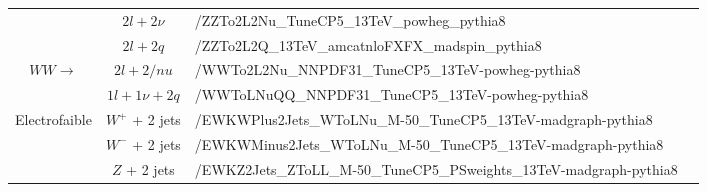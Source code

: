 \begin{table}[]
{{\begin{tabular}{|cclc|}
\multicolumn{1}{|c|}{}                                            & \multicolumn{1}{c|}{$2l+2\nu$}              & \multicolumn{1}{l|}{/ZZTo2L2Nu\_TuneCP5\_13TeV\_powheg\_pythia8}                                         &                       \\ \cline{2-4} 
\multicolumn{1}{|c|}{}                                            & \multicolumn{1}{c|}{$2l+2q$}                & \multicolumn{1}{l|}{/ZZTo2L2Q\_13TeV\_amcatnloFXFX\_madspin\_pythia8}                                    &                       \\ \hline
\multicolumn{1}{|c|}{\multirow{2}{*}{$WW\rightarrow$}}            & \multicolumn{1}{c|}{$2l+2/nu$}              & \multicolumn{1}{l|}{/WWTo2L2Nu\_NNPDF31\_TuneCP5\_13TeV-powheg-pythia8}                                  &                       \\ \cline{2-4} 
\multicolumn{1}{|c|}{}                                            & \multicolumn{1}{c|}{$1l+1\nu+2q$}           & \multicolumn{1}{l|}{/WWToLNuQQ\_NNPDF31\_TuneCP5\_13TeV-powheg-pythia8}                                  &                       \\ \hline
\multicolumn{1}{|c|}{\multirow{3}{*}{Electrofaible}}              & \multicolumn{1}{c|}{$W^+$ + 2 jets}         & \multicolumn{1}{l|}{/EWKWPlus2Jets\_WToLNu\_M-50\_TuneCP5\_13TeV-madgraph-pythia8}                       &                       \\ \cline{2-4} 
\multicolumn{1}{|c|}{}                                            & \multicolumn{1}{c|}{$W^-$ + 2 jets}         & \multicolumn{1}{l|}{/EWKWMinus2Jets\_WToLNu\_M-50\_TuneCP5\_13TeV-madgraph-pythia8}                      &                       \\ \cline{2-4} 
\multicolumn{1}{|c|}{}                                            & \multicolumn{1}{c|}{$Z$ + 2 jets}           & \multicolumn{1}{l|}{/EWKZ2Jets\_ZToLL\_M-50\_TuneCP5\_PSweights\_13TeV-madgraph-pythia8}                 &                       \\ \hline
\hline
\end{tabular}}}
\end{table}